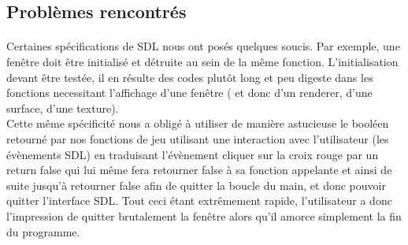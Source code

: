 \documentclass {article}
\begin{document}
\subsection{Problèmes rencontrés}
\paragraph{}
Certaines spécifications de SDL nous ont posés quelques soucis. Par exemple, une fenêtre doit être initialisé et détruite au sein de la même fonction. L'initialisation devant être testée, il en résulte des codes plutôt long et peu digeste dans les fonctions necessitant l'affichage d'une fenêtre ( et donc d'un renderer, d'une surface, d'une texture). \\
Cette même spécificité nous a obligé à utiliser de manière astucieuse le booléen retourné par nos fonctions de jeu utilisant une interaction avec l'utilisateur (les évènements SDL) en traduisant l'évènement \og cliquer sur la croix rouge \fg{} par un return false qui lui même fera retourner false à sa fonction appelante et ainsi de suite jusqu'à retourner false afin de quitter la boucle du main, et donc pouvoir quitter l'interface SDL. Tout ceci étant extrêmement rapide, l'utilisateur a donc l'impression de quitter brutalement la fenêtre alors qu'il amorce simplement la fin du programme.
\end{document}
